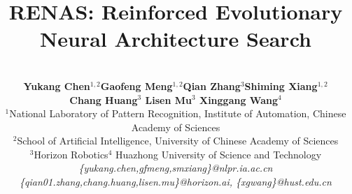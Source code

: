 \documentclass[10pt,twocolumn,letterpaper]{article}
\begin{document}
\title{RENAS: Reinforced Evolutionary Neural Architecture Search}

\author{\\ \textbf{Yukang Chen$^{1,2}$\quad Gaofeng Meng$^{1,2}$\quad Qian Zhang${}^{3}$\quad Shiming Xiang$^{1,2}$} \\
 \textbf{\quad Chang Huang${}^{3}$ \quad Lisen Mu${}^{3}$
\quad Xinggang Wang${}^{4}$}\\
${}^{1}$National Laboratory of Pattern Recognition, Institute of Automation, Chinese Academy of Sciences\\ 
${}^{2}$School of Artificial Intelligence, University of Chinese Academy of Sciences\\ 
${}^{3}$Horizon Robotics\quad ${}^{4}$ Huazhong University of Science and Technology  \\
\emph{\{yukang.chen,gfmeng,smxiang\}@nlpr.ia.ac.cn}  \\ 
\emph{\{qian01.zhang,chang.huang,lisen.mu\}@horizon.ai, \{xgwang\}@hust.edu.cn}
}
\maketitle
\end{document}
